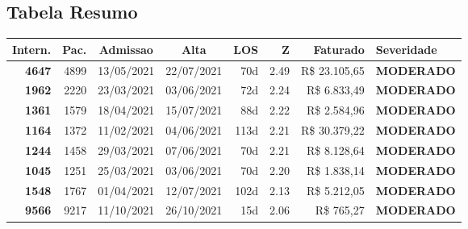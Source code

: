 \documentclass[a4paper,10pt]{article}
\begin{document}
\subsection{Tabela Resumo}
\begin{center}
\begin{longtable}{>{\scriptsize}r>{\scriptsize}r>{\scriptsize}c>{\scriptsize}c>{\scriptsize}r>{\scriptsize}r>{\scriptsize}r>{\scriptsize}l}
\toprule
\textbf{Intern.} & \textbf{Pac.} & \textbf{Admissao} & \textbf{Alta} & \textbf{LOS} & \textbf{Z} & \textbf{Faturado} & \textbf{Severidade} \\
\midrule
\endhead
\bottomrule
\endfoot

\textcolor{anomyellow}{\textbf{4647}} & 4899 & 13/05/2021 & 22/07/2021 & 70d & \textcolor{anomyellow}{2.49} & R\$ 23.105,65 & \textcolor{anomyellow}{\textbf{MODERADO}} \\

\textcolor{anomyellow}{\textbf{1962}} & 2220 & 23/03/2021 & 03/06/2021 & 72d & \textcolor{anomyellow}{2.24} & R\$ 6.833,49 & \textcolor{anomyellow}{\textbf{MODERADO}} \\

\textcolor{anomyellow}{\textbf{1361}} & 1579 & 18/04/2021 & 15/07/2021 & 88d & \textcolor{anomyellow}{2.22} & R\$ 2.584,96 & \textcolor{anomyellow}{\textbf{MODERADO}} \\

\textcolor{anomyellow}{\textbf{1164}} & 1372 & 11/02/2021 & 04/06/2021 & 113d & \textcolor{anomyellow}{2.21} & R\$ 30.379,22 & \textcolor{anomyellow}{\textbf{MODERADO}} \\

\textcolor{anomyellow}{\textbf{1244}} & 1458 & 29/03/2021 & 07/06/2021 & 70d & \textcolor{anomyellow}{2.21} & R\$ 8.128,64 & \textcolor{anomyellow}{\textbf{MODERADO}} \\

\textcolor{anomyellow}{\textbf{1045}} & 1251 & 25/03/2021 & 03/06/2021 & 70d & \textcolor{anomyellow}{2.20} & R\$ 1.838,14 & \textcolor{anomyellow}{\textbf{MODERADO}} \\

\textcolor{anomyellow}{\textbf{1548}} & 1767 & 01/04/2021 & 12/07/2021 & 102d & \textcolor{anomyellow}{2.13} & R\$ 5.212,05 & \textcolor{anomyellow}{\textbf{MODERADO}} \\

\textcolor{anomyellow}{\textbf{9566}} & 9217 & 11/10/2021 & 26/10/2021 & 15d & \textcolor{anomyellow}{2.06} & R\$ 765,27 & \textcolor{anomyellow}{\textbf{MODERADO}} \\


\end{longtable}
\end{center}
\end{document}
